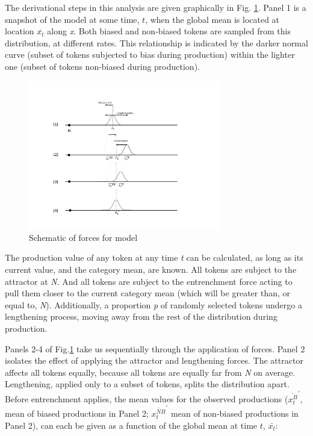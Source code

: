 The derivational steps in this analysis are given graphically in Fig.
\ref{fig:Derivation}. Panel 1 is a snapshot of the model at some
time, \emph{$t$}, when the global mean is located at location $\overline{x_{t}}$
along \emph{x}. Both biased and non-biased tokens are sampled from
this distribution, at different rates. This relationship is indicated
by the darker normal curve (subset of tokens subjected to bias during
production) within the lighter one (subset of tokens non-biased during
production). 

\begin{figure}[H]
\centering{}\includegraphics[width=0.75\textwidth]{figures/Model1Behavior.pdf}\caption{\label{fig:Derivation}Schematic of forces for  model}
\end{figure}

The production value of any token at any time \emph{t} can be calculated,
as long as its current value, and the category mean, are known. All
tokens are subject to the attractor at \emph{N}. And all tokens are
subject to the entrenchment force acting to pull them closer to the
current category mean (which will be greater than, or equal to, \emph{N}).
Additionally, a proportion \emph{p} of randomly selected tokens undergo
a lengthening process, moving away from the rest of the distribution
during production.

Panels 2-4 of Fig.\ref{fig:Derivation} take us sequentially through
the application of forces. Panel 2 isolates the effect of applying
the attractor and lengthening forces. The attractor affects all tokens
equally, because all tokens are equally far from \emph{N} on average.
Lengthening, applied only to a subset of tokens, splits the distribution
apart. Before entrenchment applies, the mean values for the observed
productions ($\overline{x_{t}^{B}}^{\prime}$, mean of biased productions
in Panel 2; $\overline{x_{t}^{NB}}^{\prime}$ mean of non-biased productions
in Panel 2), can each be given as a function of the global mean at
time $t$, $\bar{x_{t}}$:

